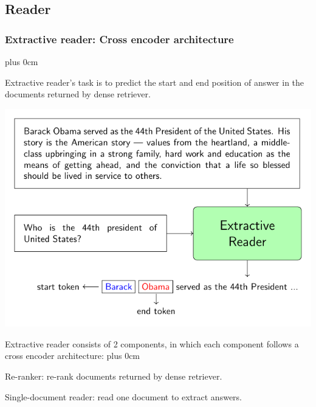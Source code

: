 \documentclass[11pt]{beamer}
\renewcommand{\raggedright}{\leftskip=0pt \rightskip=0pt plus 0cm}
\let\olditemize=\itemize
\renewenvironment{itemize}{\olditemize\raggedright}{\endlist}
\begin{document}
\subsection{Reader}
\begin{frame}
	\frametitle{Extractive reader: Cross encoder architecture}
	\begin{itemize}
		\item Extractive reader's task is to predict the start and end position of answer in the documents returned by dense retriever.\\
		\begin{center}
			\includegraphics[scale=.55]{images/PDF/extractive_reader/extractive_reader.pdf}
		\end{center}
		\item Extractive reader consists of 2 components, in which each component follows a cross encoder architecture:
		\begin{itemize}
			\item Re-ranker: re-rank documents returned by dense retriever.
			\item Single-document reader: read one document to extract answers.
		\end{itemize}
	\end{itemize}
\end{frame}
\end{document}
